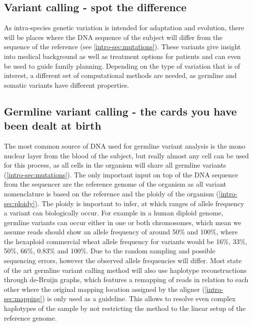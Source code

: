
\subsection[Variant calling]{Variant calling - spot the difference}
\label{intro-sec:variantcalling}
As intra-species genetic variation is intended for adaptation and evolution, there will be places where the DNA sequence of the subject will differ from the sequence of the reference (see \autoref{intro-sec:mutations}). These variants give insight into medical background as well as treatment options for patients and can even be used to guide family planning. Depending on the type of variation that is of interest, a different set of computational methods are needed, as germline and somatic variants have different properties.

\subsection[Germline]{Germline variant calling - the cards you have been dealt at birth}
\label{intro-sec:germlinecalling}
The most common source of DNA used for germline variant analysis is the mono nuclear layer from the blood of the subject, but really almost any cell can be used for this process, as all cells in the organism will share all germline variants (\autoref{intro-sec:mutations}). The only important input on top of the DNA sequence from the sequencer are the reference genome of the organism as all variant nomenclature is based on the reference and the ploidy of the organism (\autoref{intro-sec:ploidy}). The ploidy is important to infer, at which ranges of allele frequency a variant can biologically occur. For example in a human diploid genome, germline variants can occur either in one or both chromosomes, which mean we assume reads should show an allele frequency of around 50\% and 100\%, where the hexaploid commercial wheat \cite{Mayer2014} allele frequency for variants would be 16\%, 33\%, 50\%, 66\%, 0.83\% and 100\%. Due to the random sampling and possible sequencing errors, however the observed allele frequencies will differ. 
Most state of the art germline variant calling method will also use haplotype reconstructions through de-Bruijn graphs, which features a remapping of reads in relation to each other \cite{Garrison2012,Lai2016,Kim2018,Benjamin2019,Cooke2021} where the original mapping location assigned by the aligner (\autoref{intro-sec:mapping}) is only used as a guideline. This allows to resolve even complex haplotypes of the sample by not restricting the method to the linear setup of the reference genome.


